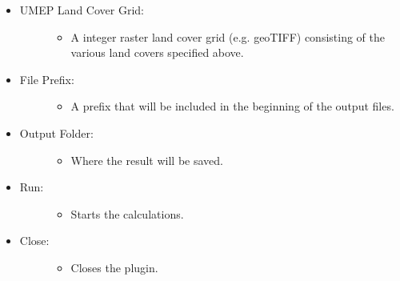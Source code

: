 \documentclass[letterpaper,10pt,english]{sphinxmanual}
\begin{document}
\begin{itemize}
\begin{description}
\begin{itemize}
\end{itemize}

\end{description}

\item {} \begin{description}
\item[{UMEP Land Cover Grid:}] \leavevmode\begin{itemize}
\item {} 
A integer raster land cover grid (e.g. geoTIFF) consisting of the various land covers specified above.

\end{itemize}

\end{description}

\item {} \begin{description}
\item[{File Prefix:}] \leavevmode\begin{itemize}
\item {} 
A prefix that will be included in the beginning of the output files.

\end{itemize}

\end{description}

\item {} \begin{description}
\item[{Output Folder:}] \leavevmode\begin{itemize}
\item {} 
Where the result will be saved.

\end{itemize}

\end{description}

\item {} \begin{description}
\item[{Run:}] \leavevmode\begin{itemize}
\item {} 
Starts the calculations.

\end{itemize}

\end{description}

\item {} \begin{description}
\item[{Close:}] \leavevmode\begin{itemize}
\item {} 
Closes the plugin.


\end{itemize}
\end{description}
\end{itemize}
\end{document}

